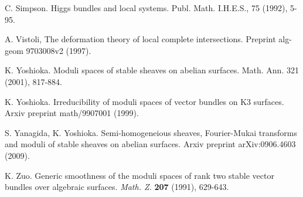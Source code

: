 \documentclass{amsart}
\theoremstyle{plain}
\numberwithin{equation}{section}
\begin{document}
\begin{thebibliography}{A}
C. Simpson. Higgs bundles and local systems. Publ. Math. I.H.E.S., 75 (1992),
5-95.

A. Vistoli, The deformation theory of local complete intersections. Preprint alg-geom 9703008v2 (1997). 

K. Yoshioka. Moduli spaces of stable sheaves on abelian surfaces. 
Math. Ann. 321 (2001), 817-884.

K. Yoshioka.
Irreducibility of moduli spaces of vector bundles on K3 surfaces.
Arxiv preprint math/9907001 (1999).

S. Yanagida, K. Yoshioka. Semi-homogeneious sheaves, Fourier-Mukai transforms and
moduli of stable sheaves on abelian surfaces. 
Arxiv preprint arXiv:0906.4603 (2009).

K. Zuo. Generic smoothness of the moduli spaces of rank two stable vector bundles
over algebraic surfaces. {\em Math. Z.} {\bf 207} (1991), 629-643.

\end{thebibliography}
\end{document}

